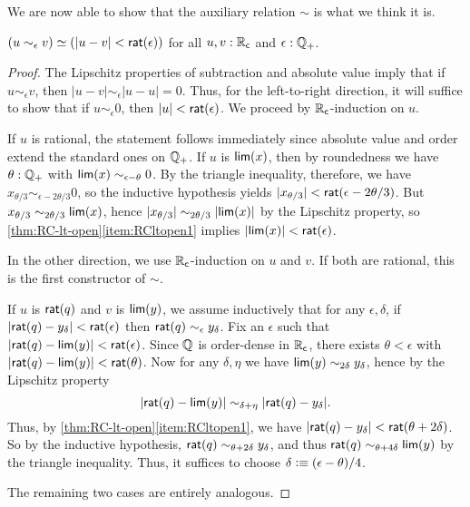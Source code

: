 We are now able to show that the auxiliary relation $\sim$ is what we think it is.

\begin{thm} \label{RC-sim-eqv-le}
  $(u \sim_\epsilon v) \simeq (|u - v| < \mathsf{rat}(\epsilon))$
  for all $u, v : \mathbb{R}_\mathsf{c}$ and $\epsilon : \mathbb{Q}_{+}$.
\end{thm}
\begin{proof}
  The Lipschitz properties of subtraction and absolute value imply that if $u\sim_\epsilon v$, then $|u-v| \sim_\epsilon |u-u| = 0$.
  Thus, for the left-to-right direction, it will suffice to show that if $u\sim_\epsilon 0$, then $|u|<\mathsf{rat}(\epsilon)$.
  We proceed by $\mathbb{R}_\mathsf{c}$-induction on $u$.

  If $u$ is rational, the statement follows immediately since absolute value and order extend the standard ones on $\mathbb{Q}_{+}$.
  If $u$ is $\mathsf{lim}(x)$, then by roundedness we have $\theta:\mathbb{Q}_{+}$ with $\mathsf{lim}(x)\sim_{\epsilon-\theta} 0$.
  By the triangle inequality, therefore, we have $x_{\theta/3} \sim_{\epsilon-2\theta/3} 0$, so the inductive hypothesis yields $|x_{\theta/3}|<\mathsf{rat}(\epsilon-2\theta/3)$.
  But $x_{\theta/3} \sim_{2\theta/3} \mathsf{lim}(x)$, hence $|x_{\theta/3}| \sim_{2\theta/3} |\mathsf{lim}(x)|$ by the Lipschitz property, so \autoref{thm:RC-lt-open}\ref{item:RCltopen1} implies $|\mathsf{lim}(x)|<\mathsf{rat}(\epsilon)$.

  In the other direction, we use $\mathbb{R}_\mathsf{c}$-induction on $u$ and $v$.
  If both are rational, this is the first constructor of $\sim$.

  If $u$ is $\mathsf{rat}(q)$ and $v$ is $\mathsf{lim}(y)$, we assume inductively that for any $\epsilon,\delta$, if $|\mathsf{rat}(q)-y_\delta|<\mathsf{rat}(\epsilon)$ then $\mathsf{rat}(q) \sim_{\epsilon} y_\delta$.
  Fix an $\epsilon$ such that $|\mathsf{rat}(q) - \mathsf{lim}(y)|<\mathsf{rat}(\epsilon)$.
  Since $\mathbb{Q}$ is order-dense in $\mathbb{R}_\mathsf{c}$, there exists $\theta<\epsilon$ with $|\mathsf{rat}(q) - \mathsf{lim}(y)|<\mathsf{rat}(\theta)$.
  Now for any $\delta,\eta$ we have $\mathsf{lim}(y)\sim_{2\delta} y_\delta$, hence by the Lipschitz property
  \[ |\mathsf{rat}(q) - \mathsf{lim}(y)| \sim_{\delta+\eta} |\mathsf{rat}(q) - y_\delta|. \]
  Thus, by \autoref{thm:RC-lt-open}\ref{item:RCltopen1}, we have $|\mathsf{rat}(q) - y_\delta| < \mathsf{rat}(\theta+2\delta)$.
  So by the inductive hypothesis, $\mathsf{rat}(q) \sim_{\theta+2\delta} y_\delta$, and thus $\mathsf{rat}(q)\sim_{\theta+4\delta} \mathsf{lim}(y)$ by the triangle inequality.
  Thus, it suffices to choose $\delta \vcentcolon\equiv (\epsilon-\theta)/4$.

  The remaining two cases are entirely analogous.
\end{proof}

